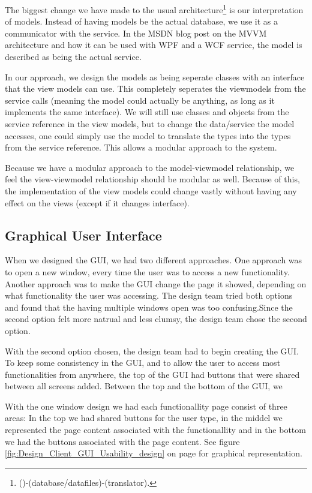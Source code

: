 The biggest change we have made to the usual architecture\footnote{()-(database/datafiles)-(translator).} is our interpretation of models. Instead of having models be the actual database, we use it as a communicator with the service. In the MSDN blog post on the MVVM architecture \cite{MSDN-WPF-MVVM} and how it can be used with WPF and a WCF service, the model is described as being the actual service. 

In our approach, we design the models as being seperate classes with an interface that the view models can use. This completely seperates the viewmodels from the service calls (meaning the model could actually be anything, as long as it implements the same interface). We will still use classes and objects from the service reference in the view models, but to change the data/service the model accesses, one could simply use the model to translate the types into the types from the service reference. This allows a modular approach to the system.

Because we have a modular approach to the model-viewmodel relationship, we feel the view-viewmodel relationship should be modular as well. Because of this, the implementation of the view models could change vastly without having any effect on the views (except if it changes interface).
\subsection{Graphical User Interface}
\label{Design_Client_GUI}
When we designed the GUI, we had two different approaches. One approach was to open a new window, every time the user was to access a new functionality. Another approach was to make the GUI change the page it showed, depending on what functionality the user was accessing. The design team tried both options and found that the having multiple windows open was too confusing.Since the second option felt more natrual and less clumsy, the design team chose the second option.

With the second option chosen, the design team had to begin creating the GUI. To keep some consistency in the GUI, and to allow the user to access most functionalities from anywhere, the top of the GUI had buttons that were shared between all screens added. Between the top and the bottom of the GUI, we 

With the one window design we had each functionallity page consist of three areas: In the top we had shared buttons for the user type, in the middel we represented the page content associated with the functionallity and in the bottom we had the buttons associated with the page content. See figure \ref{fig:Design_Client_GUI_Usability_design} on page \pageref{fig:Design_Client_GUI_Usability_design} for graphical representation.


